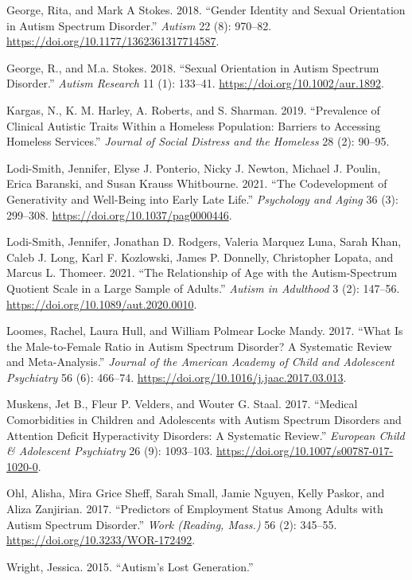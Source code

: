 \documentclass[
  letterpaper,
  DIV=11,
  numbers=noendperiod]{scrreprt}
\newlength{\cslhangindent}
\newlength{\cslentryspacingunit} %
\newenvironment{CSLReferences}[2] %
 {%
  \setlength{\parindent}{0pt}
  \ifodd #1
  \let\oldpar\par
  \def\par{\hangindent=\cslhangindent\oldpar}
  \fi
  \setlength{\parskip}{#2\cslentryspacingunit}
 }%
 {}
\begin{document}
\begin{CSLReferences}{1}{0}
\leavevmode{}%
George, Rita, and Mark A Stokes. 2018. {``Gender Identity and Sexual
Orientation in Autism Spectrum Disorder.''} \emph{Autism} 22 (8):
970--82. \url{https://doi.org/10.1177/1362361317714587}.

\leavevmode{}%
George, R., and M.a. Stokes. 2018. {``Sexual {Orientation} in {Autism
Spectrum Disorder}.''} \emph{Autism Research} 11 (1): 133--41.
\url{https://doi.org/10.1002/aur.1892}.

\leavevmode{}%
Kargas, N., K. M. Harley, A. Roberts, and S. Sharman. 2019.
{``Prevalence of Clinical Autistic Traits Within a Homeless Population:
{Barriers} to Accessing Homeless Services.''} \emph{Journal of Social
Distress and the Homeless} 28 (2): 90--95.

\leavevmode{}%
Lodi-Smith, Jennifer, Elyse J. Ponterio, Nicky J. Newton, Michael J.
Poulin, Erica Baranski, and Susan Krauss Whitbourne. 2021. {``The
Codevelopment of Generativity and Well-Being into Early Late Life.''}
\emph{Psychology and Aging} 36 (3): 299--308.
\url{https://doi.org/10.1037/pag0000446}.

\leavevmode{}%
Lodi-Smith, Jennifer, Jonathan D. Rodgers, Valeria Marquez Luna, Sarah
Khan, Caleb J. Long, Karl F. Kozlowski, James P. Donnelly, Christopher
Lopata, and Marcus L. Thomeer. 2021. {``The {Relationship} of {Age} with
the {Autism-Spectrum Quotient Scale} in a {Large Sample} of {Adults}.''}
\emph{Autism in Adulthood} 3 (2): 147--56.
\url{https://doi.org/10.1089/aut.2020.0010}.

\leavevmode{}%
Loomes, Rachel, Laura Hull, and William Polmear Locke Mandy. 2017.
{``What {Is} the {Male-to-Female Ratio} in {Autism Spectrum Disorder}?
{A Systematic Review} and {Meta-Analysis}.''} \emph{Journal of the
American Academy of Child and Adolescent Psychiatry} 56 (6): 466--74.
\url{https://doi.org/10.1016/j.jaac.2017.03.013}.

\leavevmode{}%
Muskens, Jet B., Fleur P. Velders, and Wouter G. Staal. 2017. {``Medical
Comorbidities in Children and Adolescents with Autism Spectrum Disorders
and Attention Deficit Hyperactivity Disorders: A Systematic Review.''}
\emph{European Child \& Adolescent Psychiatry} 26 (9): 1093--103.
\url{https://doi.org/10.1007/s00787-017-1020-0}.

\leavevmode{}%
Ohl, Alisha, Mira Grice Sheff, Sarah Small, Jamie Nguyen, Kelly Paskor,
and Aliza Zanjirian. 2017. {``Predictors of Employment Status Among
Adults with {Autism Spectrum Disorder}.''} \emph{Work (Reading, Mass.)}
56 (2): 345--55. \url{https://doi.org/10.3233/WOR-172492}.

\leavevmode{}%
Wright, Jessica. 2015. {``Autism's {Lost Generation}.''}

\end{CSLReferences}
\end{document}
